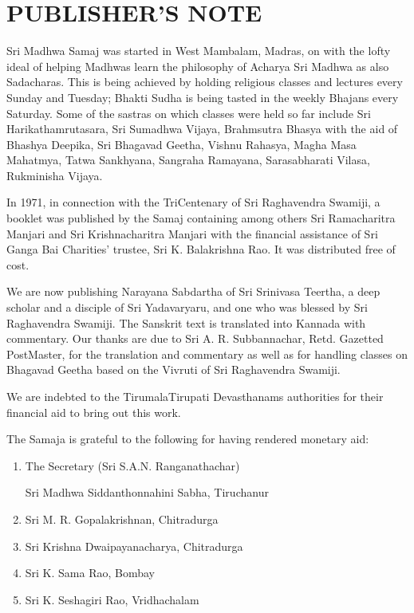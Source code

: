 
\chapter*{PUBLISHER'S NOTE}

\vskip -7pt

Sri Madhwa Samaj was started in West Mambalam, Madras, on  with the lofty ideal of helping Madhwas learn the philosophy of Acharya Sri Madhwa as also Sadacharas. This is being achieved by holding religious classes and lectures every Sunday and Tuesday; Bhakti Sudha is being tasted in the weekly Bhajans every Saturday. Some of the sastras on which classes were held so far include Sri Harikathamrutasara, Sri Sumadhwa Vijaya, Brahmsutra Bhasya with the aid of Bhashya Deepika, Sri Bhagavad Geetha, Vishnu Rahasya, Magha Masa Mahatmya, Tatwa Sankhyana, Sangraha Ramayana, Sarasabharati Vilasa, Rukminisha Vijaya.

\vskip -1pt

In 1971, in connection with the Tri\enginline{-}Centenary of Sri Raghavendra Swamiji, a booklet was published by the Samaj containing among others Sri Ramacharitra Manjari and Sri Krishnacharitra Manjari with the financial assistance of Sri Ganga Bai Charities' trustee, Sri K. Balakrishna Rao. It was distributed free of cost.

\vskip -1pt

We are now publishing Narayana Sabdartha of Sri Srinivasa Teertha, a deep scholar and a disciple of Sri Yadavaryaru, and one who was blessed by Sri Raghavendra Swamiji. The Sanskrit text is translated into Kannada with commentary. Our thanks are due to Sri A. R. Subbannachar, Retd. Gazetted Post\enginline{-}Master, for the translation and commentary as well as for handling classes on Bhagavad Geetha based on the Vivruti of Sri Raghavendra Swamiji.

We are indebted to the Tirumala\enginline{-}Tirupati Devasthanams authorities for their financial aid to bring out this work.

The Samaja is grateful to the following for having rendered monetary aid:

\begin{enumerate}
\item 
 The Secretary (Sri S.A.N. Ranganathachar)

 Sri Madhwa Siddanthonnahini Sabha, Tiruchanur

 \item Sri M. R. Gopalakrishnan, Chitradurga

 \item Sri Krishna Dwaipayanacharya, Chitradurga

 \item Sri K. Sama Rao, Bombay

 \item Sri K. Seshagiri Rao, Vridhachalam

\end{enumerate}

